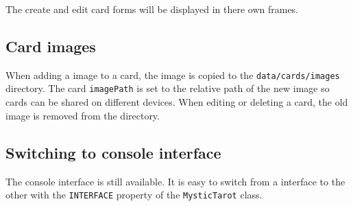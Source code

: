 \documentclass{article}
\begin{document}
\noindent
The create and edit card forms will be displayed in there own frames.

\subsection{Card images}
When adding a image to a card, the image is copied to the
\texttt{data/cards/images} directory. The card \texttt{imagePath} is set to the
relative path of the new image so cards can be shared on different devices.
When editing or deleting a card, the old image is removed from the directory.

\subsection{Switching to console interface}
The console interface is still available. It is easy to switch from a interface
to the other with the \texttt{INTERFACE} property of the \texttt{MysticTarot}
class.
\end{document}
